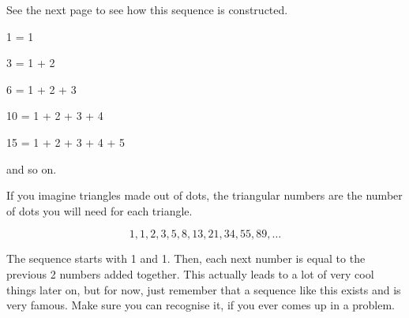 \documentclass{article}
\theoremstyle{mytheoremstyle}
\theoremstyle{mytheoremstyle}
\theoremstyle{myproblemstyle}
\begin{document}
    See the next page to see how this sequence is constructed.
    
    1 = 1
    
    3 = 1 + 2

    6 = 1 + 2 + 3

    10 = 1 + 2 + 3 + 4

    15 = 1 + 2 + 3 + 4 + 5

    and so on.

    If you imagine triangles made out of dots, the triangular numbers are the number of dots you will need for each triangle.


    \begin{theorem}

        \[1, 1, 2, 3, 5, 8, 13, 21, 34, 55, 89, \dots\]
        
    \end{theorem}

    The sequence starts with 1 and 1. Then, each next number is equal to the previous 2 numbers added together. This actually leads to a lot of very cool things later on, but for now, just remember that a sequence like this exists and is very famous. Make sure you can recognise it, if you ever comes up in a problem.
    
\end{document}
